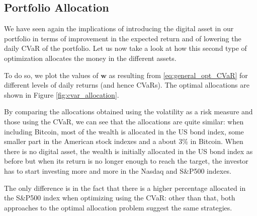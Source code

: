 \subsection{Portfolio Allocation}
We have seen again the implications of introducing the digital asset in our portfolio in terms of improvement in the expected return and of lowering the daily CVaR of the portfolio.
Let us now take a look at how this second type of optimization allocates the money in the different assets.

To do so, we  plot the values of $\mathbf{w}$ as resulting from \eqref{eq:general_opt_CVaR} for different levels of daily returns (and hence CVaRs). The optimal allocations are shown in Figure \ref{fig:cvar_allocation}.

\bigskip

By comparing the allocations obtained using the volatility as a risk measure and those using the CVaR, we can see that the allocations are quite similar: when including Bitcoin, most of the wealth is allocated in the US bond index, some smaller part in the American stock indexes and a about 3\% in Bitcoin. 
When there is no digital asset, the wealth is initially allocated in the US bond index as before but when its return is no longer enough to reach the target, the investor has to start investing more and more in the Nasdaq and S\&P500 indexes. 

The only difference is in the fact that there is a higher percentage allocated in the S\&P500 index when optimizing using the CVaR: other than that, both approaches to the optimal allocation problem suggest the same strategies.

